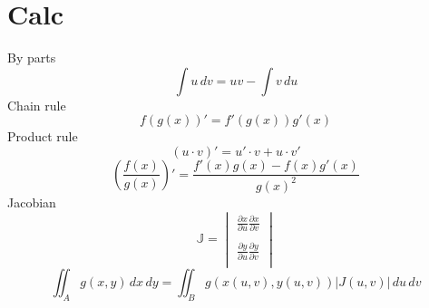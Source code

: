 \documentclass[twocolumn]{amsart}
\begin{document}
\section*{Calc}
By parts
\begin{equation*}
  \int u\,dv = uv-\int v\,du
\end{equation*}
Chain rule
\begin{equation*}
  f(g(x))' = f'(g(x))g'(x)
\end{equation*}
Product rule
\begin{equation*}
  (u \cdot v)' = u' \cdot v + u \cdot v'
\end{equation*}
\begin{equation*}
  (\frac{f(x)}{g(x)})' = \frac{f'(x)g(x) - f(x)g'(x)}{g(x)^2}
\end{equation*}
Jacobian
\begin{equation*}
\mathbb{J}=\begin{vmatrix}
\frac{\partial x}{\partial u}\frac{\partial x}{\partial v} \\
\\
\frac{\partial y}{\partial u}\frac{\partial y}{\partial v} \\
\end{vmatrix}
\end{equation*}
\begin{equation*}
  \iint_{A}g(x,y)\,dx\,dy = \iint_{B}g(x(u,v),y(u,v))|J(u,v)|\,du\,dv
\end{equation*}
\end{document}
